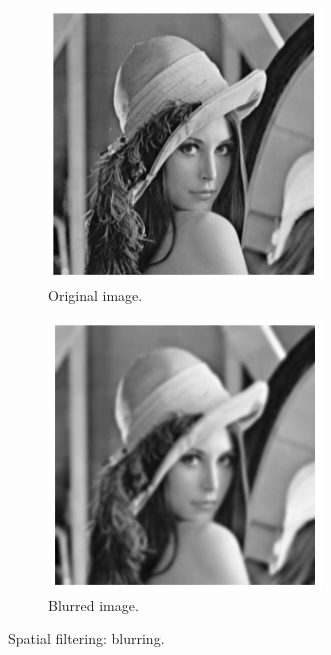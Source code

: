 \begin{figure}[h!]
\centering
\begin{subfigure}[]{0.4\textwidth}
\centering
\includegraphics[width=0.8\textwidth]{./img/lena.jpg}
\caption{\small{Original image.}}
\label{fig:lbO}
\end{subfigure}%
\begin{subfigure}[]{0.4\textwidth}
\centering
\includegraphics[width=0.8\textwidth]{./img/blur.jpg}
\caption{\small{Blurred image.}}
\label{fig:blI}
\end{subfigure}%
\caption{\small{Spatial filtering: blurring.}\label{bl}}
\end{figure}

